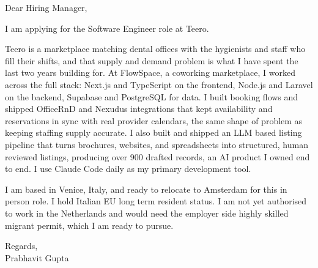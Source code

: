 \documentclass[a4paper,11pt]{article}
\begin{document}
Dear Hiring Manager,

I am applying for the Software Engineer role at Teero.

Teero is a marketplace matching dental offices with the hygienists and staff who fill their shifts, and that supply and demand problem is what I have spent the last two years building for. At FlowSpace, a coworking marketplace, I worked across the full stack: Next.js and TypeScript on the frontend, Node.js and Laravel on the backend, Supabase and PostgreSQL for data. I built booking flows and shipped OfficeRnD and Nexudus integrations that kept availability and reservations in sync with real provider calendars, the same shape of problem as keeping staffing supply accurate. I also built and shipped an LLM based listing pipeline that turns brochures, websites, and spreadsheets into structured, human reviewed listings, producing over 900 drafted records, an AI product I owned end to end. I use Claude Code daily as my primary development tool.

I am based in Venice, Italy, and ready to relocate to Amsterdam for this in person role. I hold Italian EU long term resident status. I am not yet authorised to work in the Netherlands and would need the employer side highly skilled migrant permit, which I am ready to pursue.

Regards,\\
Prabhavit Gupta
\end{document}
